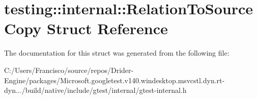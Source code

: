 \hypertarget{structtesting_1_1internal_1_1_relation_to_source_copy}{}\section{testing\+:\+:internal\+:\+:Relation\+To\+Source\+Copy Struct Reference}
\label{structtesting_1_1internal_1_1_relation_to_source_copy}


The documentation for this struct was generated from the following file\+:\begin{DoxyCompactItemize}
\item 
C\+:/\+Users/\+Francisco/source/repos/\+Drider-\/\+Engine/packages/\+Microsoft.\+googletest.\+v140.\+windesktop.\+msvcstl.\+dyn.\+rt-\/dyn.../build/native/include/gtest/internal/gtest-\/internal.\+h\end{DoxyCompactItemize}
